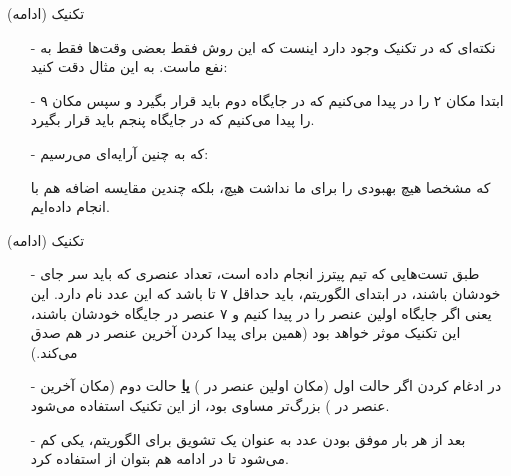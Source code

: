 \begin{frame}{تکنیک  (ادامه)}
\begin{itemize}\itemr
\item[-]
نکته‌ای که در تکنیک  وجود دارد اینست که این روش فقط بعضی وقت‌ها فقط به نفع ماست. به این مثال دقت کنید:
\begin{lfl}
\end{lfl}

\item[-]
ابتدا مکان ۲ را در 
پیدا می‌کنیم که در جایگاه دوم باید قرار بگیرد و سپس مکان ۹ را پیدا می‌کنیم که در جایگاه پنجم باید قرار بگیرد.

\item[-]
که به چنین آرایه‌ای می‌رسیم:
\begin{lfl}
\end{lfl}

که مشخصا هیچ بهبودی را برای ما نداشت هیچ، بلکه چندین مقایسه اضافه‌ هم با  انجام داده‌ایم.
\end{itemize}
\end{frame}

\begin{frame}{تکنیک  (ادامه)}
\begin{itemize}\itemr
\item[-]
طبق تست‌هایی که تیم پیترز انجام داده است، تعداد عنصری که باید سر جای خودشان باشند، در ابتدای الگوریتم، باید حداقل ۷ تا باشد که این عدد نام  دارد. این یعنی اگر جایگاه اولین عنصر 
را در 
پیدا کنیم و ۷ عنصر در جایگاه خودشان باشند، این تکنیک موثر خواهد بود (همین برای پیدا کردن آخرین عنصر  در  هم صدق می‌کند.)

\item[-]
در ادغام کردن اگر حالت اول (مکان اولین عنصر  در ) \textbf{\underline{یا}} حالت دوم (مکان آخرین عنصر  در ) بزرگ‌تر مساوی  بود، از این تکنیک استفاده می‌شود.

\item[-]
بعد از هر بار موفق بودن  عدد  به عنوان یک تشویق برای الگوریتم، یکی کم می‌شود تا در ادامه هم بتوان از  استفاده کرد.
\end{itemize}
\end{frame}

